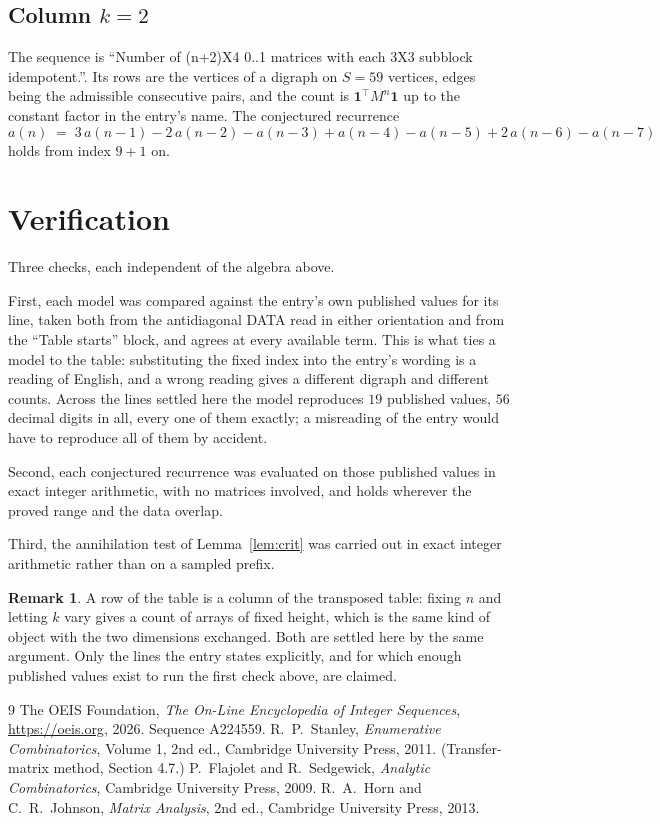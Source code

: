 \documentclass[11pt,a4paper]{article}
\theoremstyle{plain}
\theoremstyle{definition}
\newtheorem{remark}[theorem]{Remark}
\begin{document}
\subsection*{Column $k$$=2$}
The sequence is ``Number of (n+2)X4 0..1 matrices with each 3X3 subblock idempotent.''. Its rows are the vertices of a digraph on
$S=59$ vertices, edges being the admissible consecutive pairs, and the count is
$\mathbf{1}^{\!\top}M^{n}\mathbf{1}$ up to the constant factor in the entry's name.
The conjectured recurrence
\[
a(n)\;=\;3\,a(n-1) - 2\,a(n-2) - a(n-3) + a(n-4) - a(n-5) + 2\,a(n-6) - a(n-7)
\]
holds from index $9+1$ on.

\section{Verification}

Three checks, each independent of the algebra above.

First, each model was compared against the entry's own published values for its line, taken
both from the antidiagonal DATA read in either orientation and from the ``Table starts''
block, and agrees at every available term. This is what ties a model to the table:
substituting the fixed index into the entry's wording is a reading of English, and a wrong
reading gives a different digraph and different counts. Across the lines settled here the
model reproduces $19$ published values, $56$ decimal digits in all, every one of
them exactly; a misreading of the entry would have to reproduce all of them by accident.

Second, each conjectured recurrence was evaluated on those published values in exact
integer arithmetic, with no matrices involved, and holds wherever the proved range and the
data overlap.

Third, the annihilation test of Lemma~\ref{lem:crit} was carried out in exact integer
arithmetic rather than on a sampled prefix.

\begin{remark}
A row of the table is a column of the transposed table: fixing $n$ and letting $k$ vary gives a
count of arrays of fixed height, which is the same kind of object with the two dimensions
exchanged. Both are settled here by the same argument. Only the lines the entry states
explicitly, and for which enough published values exist to run the first check above, are
claimed.
\end{remark}

\begin{thebibliography}{9}
 The OEIS Foundation, \emph{The On-Line Encyclopedia of Integer
Sequences}, \url{https://oeis.org}, 2026. Sequence A224559.
 R.~P.~Stanley, \emph{Enumerative Combinatorics}, Volume 1, 2nd ed.,
Cambridge University Press, 2011. (Transfer-matrix method, Section 4.7.)
 P.~Flajolet and R.~Sedgewick, \emph{Analytic Combinatorics}, Cambridge
University Press, 2009.
 R.~A.~Horn and C.~R.~Johnson, \emph{Matrix Analysis}, 2nd ed., Cambridge
University Press, 2013.
\end{thebibliography}
\end{document}
